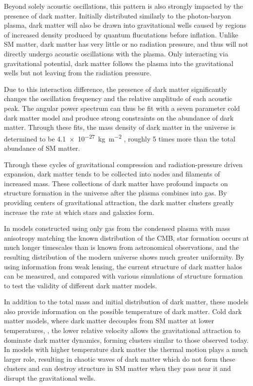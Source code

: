 Beyond solely acoustic oscillations, this pattern is also strongly impacted by the presence of dark matter.
Initially distributed similarly to the photon-baryon plasma, dark matter will also be drawn into gravitational wells caused by regions of increased density produced by quantum flucutations before inflation.
Unlike SM matter, dark matter has very little or no radiation pressure, and thus will not directly undergo acoustic oscillations with the plasma. 
Only interacting via gravitational potential, dark matter follows the plasma into the gravitational wells but not leaving from the radiation pressure. 

Due to this interaction difference, the presence of dark matter significantly changes the oscillation frequency and the relative amplitude of each acoustic peak.
The angular power spectrum can thus be fit with a seven parameter cold dark matter model and produce strong constraints on the abundance of dark matter.
Through these fits, the mass density of dark matter in the universe is determined to be \SI{4.1e-27}{\kilo\gram\per\meter\squared} \cite{PlanckCMB}, roughly 5 times more than the total abundance of SM matter.

Through these cycles of gravitational compression and radiation-pressure driven expansion, dark matter tends to be collected into nodes and filaments of increased mass. 
These collections of dark matter have profound impacts on structure formation in the universe after the plasma combines into gas.
By providing centers of gravitational attraction, the dark matter clusters greatly increase the rate at which stars and galaxies form.

In models constructed using only gas from the condensed plasma with mass anisotropy matching the known distribution of the CMB, star formation occurs at much longer timescales than is known from astronomical observations, and the resulting distribution of the modern universe shows much greater uniformity. 
By using information from weak lensing, the current structure of dark matter halos can be measured, and compared with various simulations of structure formation to test the validity of different dark matter models.

In addition to the total mass and initial distribution of dark matter, these models also provide information on the possible temperature of dark matter.
Cold dark matter models, where dark matter decouples from SM matter at lower temperatures, , the lower relative velocity allows the gravitational attraction to dominate dark matter dynamics, forming clusters similar to those observed today.
In models with higher temperature dark matter the thermal motion plays a much larger role, resulting in chaotic waves of dark matter which do not form these clusters and can destroy structure in SM matter when they pass near it and disrupt the gravitational wells.

